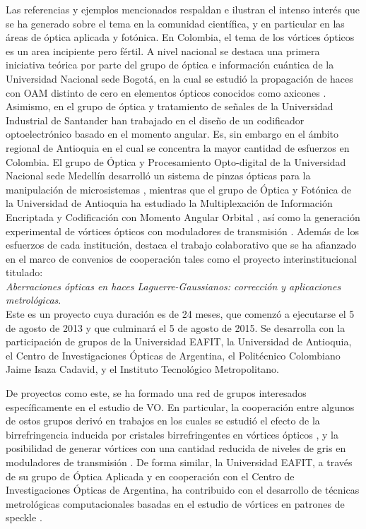 Las referencias y ejemplos mencionados respaldan e ilustran el
intenso interés que se ha generado sobre el tema en la 
comunidad científica, y en particular en las áreas de óptica
aplicada y fotónica.  En Colombia, el tema de los vórtices ópticos es
un area  incipiente pero fértil. A nivel nacional se destaca una primera
iniciativa teórica por parte del grupo de óptica e información
cuántica de la  Universidad Nacional sede
Bogotá, en la cual se estudió la propagación de haces con OAM distinto de
cero en elementos ópticos conocidos como axicones
. Asimismo, en el grupo de óptica y tratamiento de
señales de la Universidad Industrial de Santander han trabajado en el diseño de un codificador optoelectrónico
basado en el momento angular. Es,
sin embargo en el ámbito regional de Antioquia en el cual se
concentra la mayor cantidad de esfuerzos en Colombia.  El grupo de
Óptica y Procesamiento Opto-digital de la Universidad 
Nacional sede Medellín desarrolló un sistema de pinzas ópticas para la
manipulación de microsistemas , mientras que el grupo de Óptica y Fotónica
de la Universidad de Antioquia ha estudiado la Multiplexación de
Información Encriptada y Codificación con Momento Angular
Orbital , así como la generación experimental de
vórtices ópticos con moduladores de transmisión
. Además de los esfuerzos
de cada institución, destaca el trabajo colaborativo que se ha afianzado en el marco de convenios de
cooperación tales como el proyecto interinstitucional titulado:\\
\textit{Aberraciones ópticas en haces Laguerre-Gaussianos: corrección
  y aplicaciones metrológicas}. \\Este es un proyecto cuya duración es  de 24 meses, que
comenzó a ejecutarse el 5 de agosto de 2013 y que culminará el 5 de
agosto de 2015. Se desarrolla con la participación de grupos de la
Universidad EAFIT, la Universidad de Antioquia, el Centro de
Investigaciones Ópticas de Argentina, el Politécnico Colombiano Jaime
Isaza Cadavid, y el Instituto Tecnológico Metropolitano. 

De proyectos como este, se ha formado una red de grupos interesados
específicamente en el estudio de VO. En particular,
la cooperación entre algunos de ostos grupos derivó en trabajos en los
cuales se estudió el efecto de la birrefringencia inducida por
cristales birrefringentes en vórtices ópticos , y la
posibilidad de generar vórtices con una cantidad reducida de niveles
de gris en moduladores de transmisión . De forma
similar, la Universidad EAFIT, a través de su grupo de Óptica Aplicada
y en cooperación con el Centro de Investigaciones Ópticas de
Argentina,  ha contribuido con el desarrollo de técnicas metrológicas
computacionales basadas en el estudio de  vórtices en patrones de
speckle
. 


